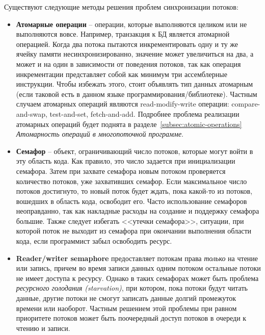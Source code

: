 Существуют следующие методы решения проблем синхронизации потоков:
\begin{itemize}
    \item\textbf{Атомарные операции} -- операции, которые выполняются целиком или не выполняются вовсе.
    Например, транзакция к БД является атомарной операцией.
    Когда два потока пытаются инкрементировать одну и ту же ячейку памяти несинхронизированно, значение может увеличиться на два, а может и на один в зависимости от поведения потоков, так как операция инкрементации представляет собой как минимум три ассемблерные инструкции.
    Чтобы избежать этого, стоит объявлять тип данных атомарным (если таковой есть в данном языке программирования/библиотеке).
    Частным случаем атомарных операций являются read-modify-write операции: compare-and-swap, test-and-set, fetch-and-add.
    Подробнее проблема реализации атомарных операций будет поднята в разделе~\ref{subsec:atomic-operations} \textit{Атомарность операций в многопоточной программе}.
    
    \item\textbf{Семафор} -- объект, ограничивающий число потоков, которые могут войти в эту область кода.
    Как правило, это число задается при инициализации семафора.
    Затем при захвате семафора новым потоком проверяется количество потоков, уже захвативших семафор.
    Если максимальное число потоков достигнуто, то новый поток будет ждать, пока какой-то из потоков, вошедших в область кода, освободит его.
    Часто использование семафоров неоправданно, так как накладные расходы на создание и поддержку семафора большие.
    Также следует избегать <<утечки семафора>>, ситуации, при которой поток не выходит из семафора при окончании выполнения области кода, если программист забыл освободить ресурс.
    
    \item\textbf{Reader/writer semaphore} предоставляет потокам права \textit{только} на чтение или запись, причем во время записи данных одним потоком остальные потоки не имеет доступа к ресурсу.
    Однако в таких семафорах может быть проблема \textit{ресурсного голодания (starvation)}, при котором, пока потоки будут читать данные, другие потоки не смогут записать данные долгий промежуток времени или наоборот.
    Частным решением этой проблемы при равном приоритете потоков может быть поочередный доступ потоков в очереди к чтению и записи.
    

\end{itemize}
